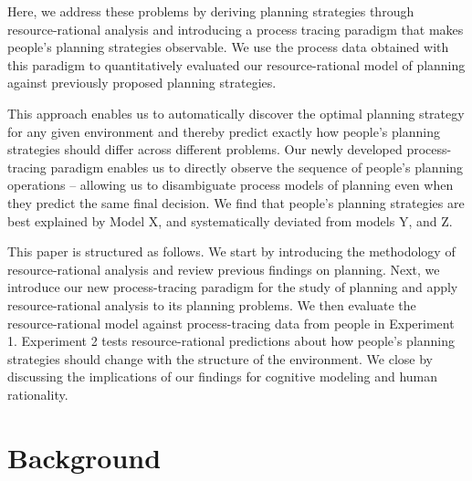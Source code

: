 Here, we address these problems by deriving planning strategies through resource-rational analysis and introducing a process tracing paradigm that makes people's planning strategies observable. We use the process data obtained with this paradigm to quantitatively evaluated our resource-rational model of planning against previously proposed planning strategies.

This approach enables us to automatically discover the optimal planning strategy for any given environment and thereby predict exactly how people's planning strategies should differ across different problems. Our newly developed process-tracing paradigm enables us to directly observe the sequence of people's planning operations -- allowing us to disambiguate process models of planning even when they predict the same final decision. We find that people's planning strategies are best explained by Model X, and systematically deviated from models Y, and Z. 

This paper is structured as follows. We start by introducing the methodology of resource-rational analysis and review previous findings on planning. Next, we introduce our new process-tracing paradigm for the study of planning and apply resource-rational analysis to its planning problems. We then evaluate the resource-rational model against process-tracing data from people in Experiment 1. Experiment 2 tests resource-rational predictions about how people's planning strategies should change with the structure of the environment. We close by discussing the implications of our findings for cognitive modeling and human rationality.

\section{Background}
\label{sec:background}

